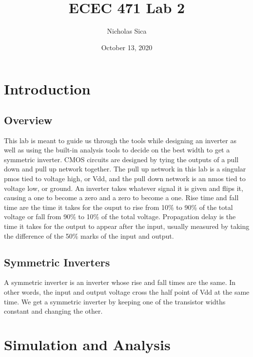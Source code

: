\documentclass[12pt]{article}
\begin{document}
\title{ECEC 471 Lab 2}
\author{Nicholas Sica}
\date{October 13, 2020}
\maketitle

\tableofcontents
\newpage

\section{Introduction}
\subsection{Overview}
This lab is meant to guide us through the tools while designing an inverter as well as using the built-in analysis tools to decide on the best width to get a symmetric inverter. CMOS circuits are designed by tying the outputs of a pull down and pull up network together. The pull up network in this lab is a singular pmos tied to voltage high, or Vdd, and the pull down network is an nmos tied to voltage low, or ground. An inverter takes whatever signal it is given and flips it, causing a one to become a zero and a zero to become a one.
Rise time and fall time are the time it takes for the ouput to rise from 10\% to 90\% of the total voltage or fall from 90\% to 10\% of the total voltage.
Propagation delay is the time it takes for the output to appear after the input, usually measured by taking the difference of the 50\% marks of the input and output.
\subsection{Symmetric Inverters}
A symmetric inverter is an inverter whose rise and fall times are the same. In other words, the input and output voltage cross the half point of Vdd at the same time. We get a symmetric inverter by keeping one of the transistor widths constant and changing the other.
\section{Simulation and Analysis}
\end{document}
